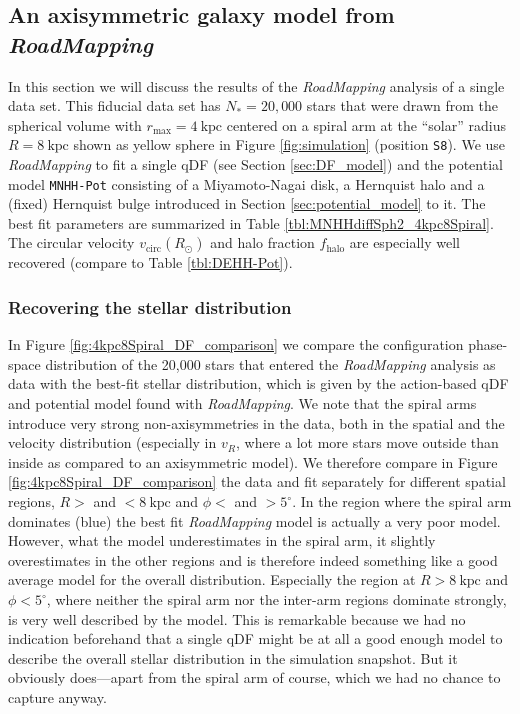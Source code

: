 \documentclass[iop,revtex4,numberedappendix,appendixfloats]{emulateapj}
\newcommand{\RM}{{\sl RoadMapping}}
\begin{document}


\subsection{An axisymmetric galaxy model from \RM{}} \label{sec:results_part1}

In this section we will discuss the results of the \RM{} analysis of a single data set. This fiducial data set has $N_*=20,000$ stars that were drawn from the spherical volume with $r_\text{max}=4~\text{kpc}$ centered on a spiral arm at the ``solar'' radius $R=8~\text{kpc}$ shown as yellow sphere in Figure \ref{fig:simulation} (position \texttt{S8}). We use \RM{} to fit a single qDF (see Section \ref{sec:DF_model}) and the potential model \texttt{MNHH-Pot} consisting of a Miyamoto-Nagai disk, a Hernquist halo and a (fixed) Hernquist bulge introduced in Section \ref{sec:potential_model} to it. The best fit parameters are summarized in Table \ref{tbl:MNHHdiffSph2_4kpc8Spiral}. The circular velocity $v_\text{circ}(R_\odot)$ and halo fraction $f_\text{halo}$ are especially well recovered (compare to Table \ref{tbl:DEHH-Pot}).

\subsubsection{Recovering the stellar distribution} \label{sec:4kpc8Spiral_DF}

In Figure \ref{fig:4kpc8Spiral_DF_comparison} we compare the configuration phase-space distribution of the 20,000 stars that entered the \RM{} analysis as data with the best-fit stellar distribution, which is given by the action-based qDF and potential model found with \RM{}. We note that the spiral arms introduce very strong non-axisymmetries in the data, both in the spatial and the velocity distribution (especially in $v_R$, where a lot more stars move outside than inside as compared to an axisymmetric model). We therefore compare in Figure \ref{fig:4kpc8Spiral_DF_comparison} the data and fit separately for different spatial regions, $R>$ and $<8~\text{kpc}$ and $\phi<$ and $>5^\circ$. In the region where the spiral arm dominates (blue) the best fit \RM{} model is actually a very poor model. However, what the model underestimates in the spiral arm, it slightly overestimates in the other regions and is therefore indeed something like a good average model for the overall distribution. Especially the region at $R>8~\text{kpc}$ and $\phi<5^\circ$, where neither the spiral arm nor the inter-arm regions dominate strongly, is very well described by the model. This is remarkable because we had no indication beforehand that a single qDF might be at all a good enough model to describe the overall stellar distribution in the simulation snapshot. But it obviously does---apart from the spiral arm of course, which we had no chance to capture anyway.
\end{document}
